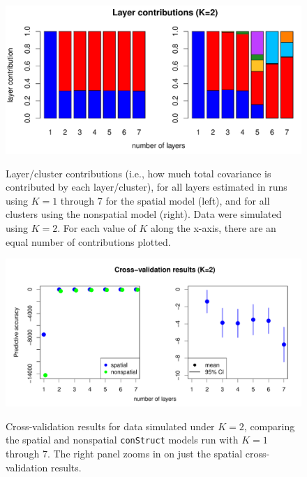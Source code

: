 \documentclass[10pt,letterpaper]{article}
\begin{document}
\begin{figure}
	\centering
		{\includegraphics[width=\textwidth]{figs/sims/simK2_laycon_barplots.pdf}}
		\caption{
			Layer/cluster contributions (i.e., how much total covariance is contributed by each layer/cluster), 
			for all layers estimated in runs using $K = 1$ through 7 
			for the spatial model (left), 
			and for all clusters using the nonspatial model (right).
			Data were simulated using $K=2$.
			For each value of $K$ along the x-axis, there are an equal number of contributions plotted.
		}\label{simK2_laycon}
\end{figure}

\begin{figure}
	\centering
		{\includegraphics[width=\textwidth]{figs/sims/simK2_std_xval.pdf}}
		\caption{
			Cross-validation results for data simulated under $K=2$,
			comparing the spatial and nonspatial \texttt{conStruct} models run with $K=1$ through 7.  
			The right panel zooms in on just the spatial cross-validation results.
		}\label{simK2_xval}
\end{figure}
\end{document}
